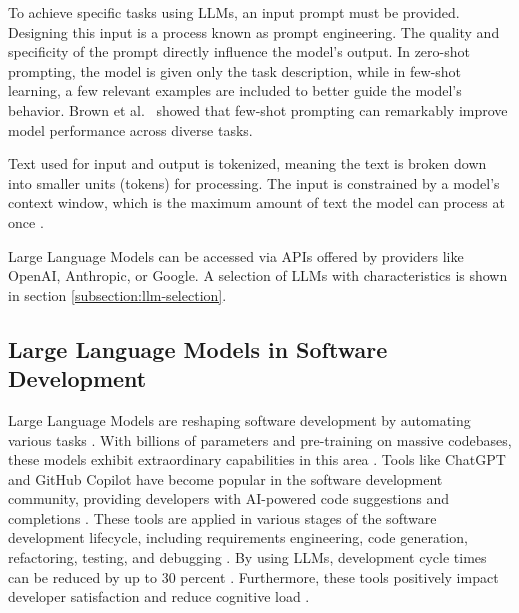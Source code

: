 To achieve specific tasks using \acp{LLM}, an input prompt must be provided. Designing this input is a process known as prompt engineering. The quality and specificity of the prompt directly influence the model's output. In zero-shot prompting, the model is given only the task description, while in few-shot learning, a few relevant examples are included to better guide the model's behavior. Brown et al.~\cite{brownLanguageModelsAre2020} showed that few-shot prompting can remarkably improve model performance across diverse tasks.

Text used for input and output is tokenized, meaning the text is broken down into smaller units (tokens) for processing. The input is constrained by a model's context window, which is the maximum amount of text the model can process at once \cite{naveedComprehensiveOverviewLarge2024}.

Large Language Models can be accessed via APIs offered by providers like OpenAI, Anthropic, or Google. A selection of \acp{LLM} with characteristics is shown in section \ref{subsection:llm-selection}.

\subsection{Large Language Models in Software Development}

Large Language Models are reshaping software development by automating various tasks \cite{houLargeLanguageModels2024}. With billions of parameters and pre-training on massive codebases, these models exhibit extraordinary capabilities in this area \cite{chenUnveilingPitfallsUnderstanding2025}. Tools like ChatGPT \cite{IntroducingChatGPT2024} and GitHub Copilot \cite{dohmkeGitHubCopilotMeet2025} have become popular in the software development community, providing developers with AI-powered code suggestions and completions \cite{bhargavmallampatiRoleGenerativeAI2025}. These tools are applied in various stages of the software development lifecycle, including requirements engineering, code generation, refactoring, testing, and debugging \cite{houLargeLanguageModels2024, puvvadiCodingAgentsComprehensive2025, bhargavmallampatiRoleGenerativeAI2025}. By using \acp{LLM}, development cycle times can be reduced by up to 30 percent \cite{bhargavmallampatiRoleGenerativeAI2025, kalliamvakouResearchQuantifyingGitHub2022}. Furthermore, these tools positively impact developer satisfaction and reduce cognitive load \cite{kalliamvakouResearchQuantifyingGitHub2022}.

